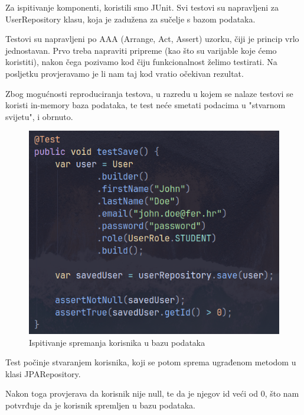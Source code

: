 Za ispitivanje komponenti, koristili smo JUnit. Svi testovi su 
napravljeni za UserRepository klasu, koja je zadužena za sučelje s bazom 
podataka.

Testovi su napravljeni po AAA (Arrange, Act, Assert) uzorku, čiji je princip 
vrlo jednostavan. Prvo treba napraviti pripreme (kao što su varijable koje 
ćemo koristiti), nakon čega pozivamo kod čiju funkcionalnost želimo testirati. 
Na posljetku provjeravamo je li nam taj kod vratio očekivan 
rezultat.

Zbog mogućnosti reproduciranja testova, u razredu u kojem se nalaze testovi se 
koristi in-memory baza podataka, te test neće smetati podacima u "stvarnom 
svijetu", i obrnuto.

\begin{figure}[H]
	\includegraphics[scale=0.6]{slike/test_1.png}
	\centering
	\caption{Ispitivanje spremanja korisnika u bazu podataka}
	\label{fig:test_1}

\end{figure}

Test počinje stvaranjem korisnika, koji se potom sprema ugrađenom metodom u 
klasi JPARepository.

Nakon toga provjerava da korisnik nije null, te da je njegov id veći od 0, što 
nam potvrđuje da je korisnik spremljen u bazu podataka.

